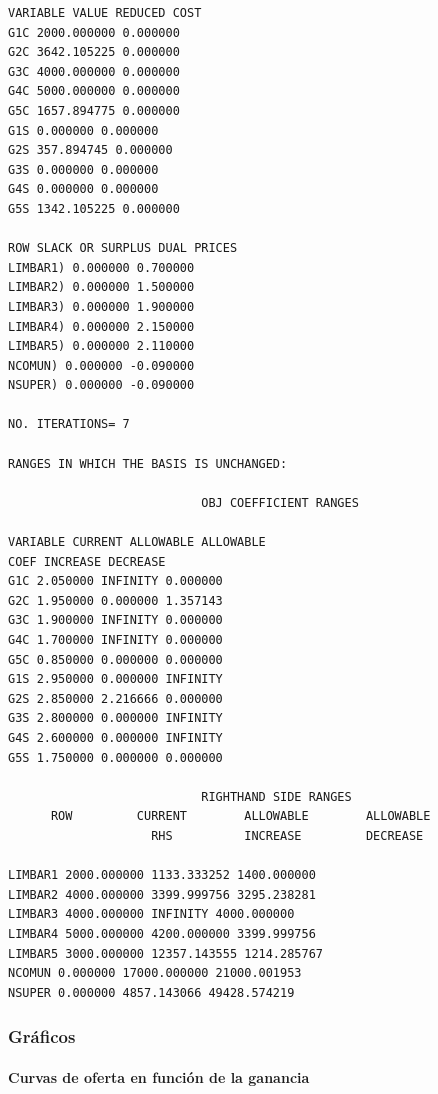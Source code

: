 \documentclass[
]{article}
\begin{document}
\begin{lstlisting}
VARIABLE VALUE REDUCED COST
G1C 2000.000000 0.000000
G2C 3642.105225 0.000000
G3C 4000.000000 0.000000
G4C 5000.000000 0.000000
G5C 1657.894775 0.000000
G1S 0.000000 0.000000
G2S 357.894745 0.000000
G3S 0.000000 0.000000
G4S 0.000000 0.000000
G5S 1342.105225 0.000000

ROW SLACK OR SURPLUS DUAL PRICES
LIMBAR1) 0.000000 0.700000
LIMBAR2) 0.000000 1.500000
LIMBAR3) 0.000000 1.900000
LIMBAR4) 0.000000 2.150000
LIMBAR5) 0.000000 2.110000
NCOMUN) 0.000000 -0.090000
NSUPER) 0.000000 -0.090000

NO. ITERATIONS= 7

RANGES IN WHICH THE BASIS IS UNCHANGED:

                           OBJ COEFFICIENT RANGES

VARIABLE CURRENT ALLOWABLE ALLOWABLE
COEF INCREASE DECREASE
G1C 2.050000 INFINITY 0.000000
G2C 1.950000 0.000000 1.357143
G3C 1.900000 INFINITY 0.000000
G4C 1.700000 INFINITY 0.000000
G5C 0.850000 0.000000 0.000000
G1S 2.950000 0.000000 INFINITY
G2S 2.850000 2.216666 0.000000
G3S 2.800000 0.000000 INFINITY
G4S 2.600000 0.000000 INFINITY
G5S 1.750000 0.000000 0.000000

                           RIGHTHAND SIDE RANGES
      ROW         CURRENT        ALLOWABLE        ALLOWABLE
                    RHS          INCREASE         DECREASE

LIMBAR1 2000.000000 1133.333252 1400.000000
LIMBAR2 4000.000000 3399.999756 3295.238281
LIMBAR3 4000.000000 INFINITY 4000.000000
LIMBAR4 5000.000000 4200.000000 3399.999756
LIMBAR5 3000.000000 12357.143555 1214.285767
NCOMUN 0.000000 17000.000000 21000.001953
NSUPER 0.000000 4857.143066 49428.574219
\end{lstlisting}

\hypertarget{gruxe1ficos}{%
\subsubsection{Gráficos}\label{gruxe1ficos}}

\hypertarget{curvas-de-oferta-en-funciuxf3n-de-la-ganancia}{%
\paragraph{Curvas de oferta en función de la
ganancia}\label{curvas-de-oferta-en-funciuxf3n-de-la-ganancia}}
\end{document}
